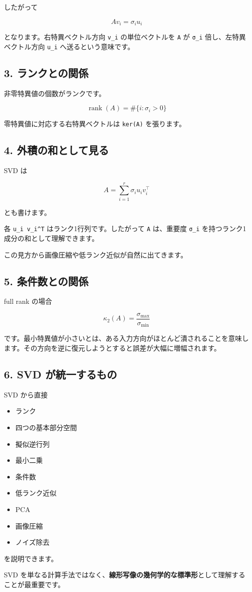 \documentclass[
  11pt,
  a4paper,
]{ltjsarticle}
\providecommand{\tightlist}{%
  \setlength{\itemsep}{0pt}\setlength{\parskip}{0pt}}
\begin{document}
したがって

\[
Av_i=\sigma_i u_i
\]

となります。右特異ベクトル方向 \texttt{v\_i} の単位ベクトルを \texttt{A}
が \texttt{σ\_i} 倍し、左特異ベクトル方向 \texttt{u\_i}
へ送るという意味です。

\hypertarget{ux30e9ux30f3ux30afux3068ux306eux95a2ux4fc2}{%
\subsection{3.
ランクとの関係}\label{ux30e9ux30f3ux30afux3068ux306eux95a2ux4fc2}}

非零特異値の個数がランクです。

\[
\operatorname{rank}(A)=\#\{i:\sigma_i>0\}
\]

零特異値に対応する右特異ベクトルは \texttt{ker(A)} を張ります。

\hypertarget{ux5916ux7a4dux306eux548cux3068ux3057ux3066ux898bux308b}{%
\subsection{4.
外積の和として見る}\label{ux5916ux7a4dux306eux548cux3068ux3057ux3066ux898bux308b}}

SVD は

\[
A=\sum_{i=1}^r\sigma_i u_i v_i^\top
\]

とも書けます。

各 \texttt{u\_i\ v\_i\^{}T} はランク1行列です。したがって \texttt{A}
は、重要度 \texttt{σ\_i} を持つランク1成分の和として理解できます。

この見方から画像圧縮や低ランク近似が自然に出てきます。

\hypertarget{ux6761ux4ef6ux6570ux3068ux306eux95a2ux4fc2}{%
\subsection{5.
条件数との関係}\label{ux6761ux4ef6ux6570ux3068ux306eux95a2ux4fc2}}

full rank の場合

\[
\kappa_2(A)=\frac{\sigma_{\max}}{\sigma_{\min}}
\]

です。最小特異値が小さいとは、ある入力方向がほとんど潰されることを意味します。その方向を逆に復元しようとすると誤差が大幅に増幅されます。

\hypertarget{svd-ux304cux7d71ux4e00ux3059ux308bux3082ux306e}{%
\subsection{6. SVD
が統一するもの}\label{svd-ux304cux7d71ux4e00ux3059ux308bux3082ux306e}}

SVD から直接

\begin{itemize}
\tightlist
\item
  ランク
\item
  四つの基本部分空間
\item
  擬似逆行列
\item
  最小二乗
\item
  条件数
\item
  低ランク近似
\item
  PCA
\item
  画像圧縮
\item
  ノイズ除去
\end{itemize}

を説明できます。

SVD
を単なる計算手法ではなく、\textbf{線形写像の幾何学的な標準形}として理解することが最重要です。
\end{document}
